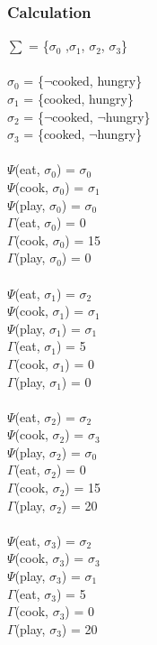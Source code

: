 \documentclass[11pt]{article}
\begin{document}
	\subsubsection{Calculation}\label{par:p303}
	$\sum$ = \{$\sigma_{0}$ ,$\sigma_{1}$, $\sigma_{2}$, $\sigma_{3}$\}\\
	\\
	$\sigma_{0}$ = \{$\neg$cooked, hungry\}\\
	$\sigma_{1}$ = \{cooked, hungry\}\\
	$\sigma_{2}$ = \{$\neg$cooked, $\neg$hungry\}\\
	$\sigma_{3}$ = \{cooked, $\neg$hungry\}\\
	\\
	\(  \Psi  \)(eat, $\sigma_{0}$) = $\sigma_{0}$\\
	\(  \Psi  \)(cook, $\sigma_{0}$) = $\sigma_{1}$\\
	\(  \Psi  \)(play, $\sigma_{0}$) = $\sigma_{0}$\\
	\(\Gamma\)(eat, $\sigma_{0}$) = 0\\
	\(\Gamma\)(cook, $\sigma_{0}$) = 15\\
	\(\Gamma\)(play, $\sigma_{0}$) = 0\\
	\\
	\(  \Psi  \)(eat, $\sigma_{1}$) = $\sigma_{2}$\\
	\(  \Psi  \)(cook, $\sigma_{1}$) = $\sigma_{1}$\\
	\(  \Psi  \)(play, $\sigma_{1}$) = $\sigma_{1}$\\
	\(\Gamma\)(eat, $\sigma_{1}$) = 5\\
	\(\Gamma\)(cook, $\sigma_{1}$) = 0\\
	\(\Gamma\)(play, $\sigma_{1}$) = 0\\
	\\
	\(  \Psi  \)(eat, $\sigma_{2}$) = $\sigma_{2}$\\
	\(  \Psi  \)(cook, $\sigma_{2}$) = $\sigma_{3}$\\
	\(  \Psi  \)(play, $\sigma_{2}$) = $\sigma_{0}$\\
	\(\Gamma\)(eat, $\sigma_{2}$) = 0\\
	\(\Gamma\)(cook, $\sigma_{2}$) = 15\\
	\(\Gamma\)(play, $\sigma_{2}$) = 20\\
	\\
	\(  \Psi  \)(eat, $\sigma_{3}$) = $\sigma_{2}$\\
	\(  \Psi  \)(cook, $\sigma_{3}$) = $\sigma_{3}$\\
	\(  \Psi  \)(play, $\sigma_{3}$) = $\sigma_{1}$\\
	\(\Gamma\)(eat, $\sigma_{3}$) = 5\\
	\(\Gamma\)(cook, $\sigma_{3}$) = 0\\
	\(\Gamma\)(play, $\sigma_{3}$) = 20\\
	\\
\end{document}

